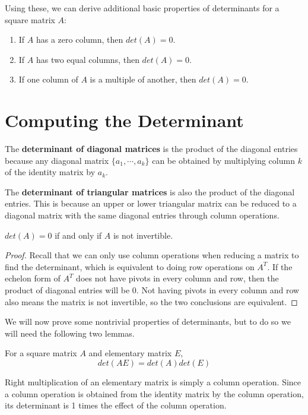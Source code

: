Using these, we can derive additional basic properties of determinants for a square matrix $A$:
\begin{enumerate}
	\item If $A$ has a zero column, then $det(A) = 0$. 
	\item If $A$ has two equal columns, then $det(A) = 0$. 
	\item If one column of $A$ is a multiple of another, then $det(A) = 0$. 
\end{enumerate}

\section{Computing the Determinant}
The \textbf{determinant of diagonal matrices} is the product of the diagonal entries because any diagonal matrix $\{a_{1}, \cdots, a_{k}\}$ can be obtained by multiplying column $k$ of the identity matrix by $a_{k}$. 

The \textbf{determinant of triangular matrices} is also the product of the diagonal entries. This is because an upper or lower triangular matrix can be reduced to a diagonal matrix with the same diagonal entries through column operations. 

\begin{theorem}
$det(A) = 0$ if and only if $A$ is not invertible. 
\end{theorem}

\begin{proof}
Recall that we can only use column operations when reducing a matrix to find the determinant, which is equivalent to doing row operations on $A^{T}$. If the echelon form of $A^{T}$ does not have pivots in every column and row, then the product of diagonal entries will be 0. Not having pivots in every column and row also means the matrix is not invertible, so the two conclusions are equivalent. 
\end{proof}

We will now prove some nontrivial properties of determinants, but to do so we will need the following two lemmas. 

\begin{lemma}
For a square matrix $A$ and elementary matrix $E$, 
$$det(AE) = det(A) det(E)$$
\end{lemma}

\begin{lproof}
Right multiplication of an elementary matrix is simply a column operation. Since a column operation is obtained from the identity matrix by the column operation, its determinant is 1 times the effect of the column operation. 
\end{lproof}

